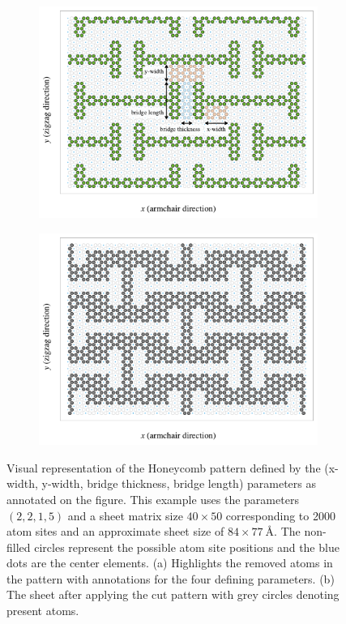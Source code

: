 \begin{figure}[!htb]
  \centering
  \begin{subfigure}[t]{0.48\textwidth}
      \centering
      \includegraphics[width=\textwidth]{figures/system/honeycomb_inverse.pdf}
      \caption{}
      \label{fig:honeycomb_a}
    \end{subfigure}
    \hfill
    \begin{subfigure}[t]{0.48\textwidth}
      \centering
      \includegraphics[width=\textwidth]{figures/system/honeycomb_pattern.pdf}
      \caption{}
      \label{fig:honeycomb_b}
  \end{subfigure}
  \hfill
     \caption{Visual representation of the Honeycomb pattern defined by the (x-width, y-width, bridge thickness, bridge length) parameters as annotated on the figure. This example uses the parameters $(2,2,1,5)$ and a sheet matrix size $40 \times 50$ corresponding to 2000 atom sites and an approximate sheet size of $84 \times \SI{77}{\text{Å}}$. The non-filled circles represent the possible atom site positions and the blue dots are the center elements. (a) Highlights the removed atoms in the pattern with annotations for the four defining parameters. (b) The sheet after applying the cut pattern with grey circles denoting present atoms. }
     \label{fig:honeycomb}
\end{figure}


